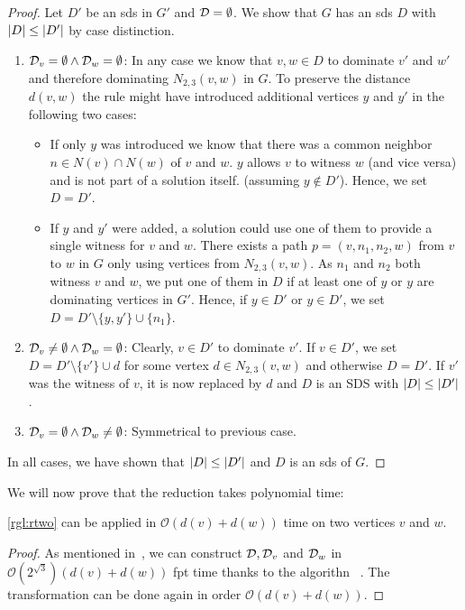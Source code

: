 \begin{proof}
    Let $D'$ be an sds in $G'$ and $\mathcal{D} =  \emptyset$. 
    We show that $G$ has an sds $D$ with $\abs{D} \leq \abs{D'}$ by case distinction. 
    \begin{enumerate}
        \item  $\mathcal{D}_{v} = \emptyset \wedge \mathcal{D}_{w} = \emptyset$: In any case we know that $v,w \in D$ to dominate $v'$ and $w'$ and therefore dominating $N_{2,3}(v,w)$ in $G$. 
        To preserve the distance $d(v,w)$ the rule might have introduced additional vertices $y$ and $y'$ in the following two cases:            
        \begin{itemize}
            \item If only $y$ was introduced we know that there was a common neighbor $n \in N(v) \cap N(w)$ of $v$ and $w$. $y$ allows $v$ to witness $w$ (and vice versa) and is not part of a solution itself. (assuming $y \notin D'$). Hence, we set $D = D'$.
            \item If $y$ and $y'$ were added, a solution could use one of them to provide a single witness for $v$ and $w$. There exists a path $p = (v, n_1, n_2, w)$ from $v$ to $w$ in $G$ only using vertices from $N_{2,3}(v,w)$. As $n_1$ and $n_2$ both witness $v$ and $w$, we put one of them in $D$ if at least one of $y$ or $y$ are dominating vertices in $G'$.
            Hence, if $y \in D'$ or $y \in D'$, we set $D = D' \setminus \{y,y'\} \cup \{n_1\}$.
        \end{itemize}
        \item  $\mathcal{D}_{v} \neq \emptyset \wedge \mathcal{D}_{w} = \emptyset$: Clearly, $v \in D'$ to dominate $v'$. If $v \in D'$, we set $D =  D' \setminus \{v'\} \cup d$ for some vertex $d \in N_{2,3}(v,w)$ and otherwise $D = D'$. If $v'$ was the witness of $v$, it is now replaced by $d$ and $D$ is an SDS with $\abs{D} \leq \abs{D'}$.
        \item  $\mathcal{D}_{v} = \emptyset \wedge \mathcal{D}_{w} \neq \emptyset$: Symmetrical to previous case.
    \end{enumerate} 
    In all cases, we have shown that $\abs{D} \leq \abs{D'}$ and $D$ is an sds of $G$.

\end{proof}

We will now prove that the reduction takes polynomial time:

\begin{corollary}\label{complex:rtwo}
\cref{rgl:rtwo} can be applied in $\mathcal{O}(d(v) + d(w))$ time on two vertices $v$ and $w$.
\end{corollary}
\begin{proof}
As mentioned in~\cite{Garnero2018}, we can construct $\mathcal{D}, \mathcal{D}_{v}$ and $\mathcal{D}_{w}$ in $\mathcal{O}(2^{\sqrt{3}})(d(v) + d(w))$ fpt time thanks to the algorithn \pdomp~\cite{Alber2002}.
The transformation can be done again in order $\mathcal{O}(d(v) + d(w))$.
\end{proof}

